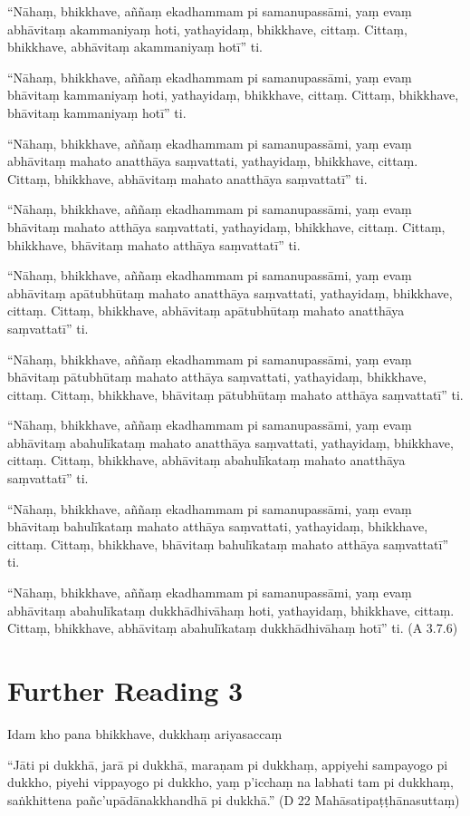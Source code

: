 “Nāhaṃ, bhikkhave, aññaṃ ekadhammam pi samanupassāmi, yaṃ evaṃ abhāvitaṃ akammaniyaṃ hoti, yathayidaṃ, bhikkhave, cittaṃ. Cittaṃ, bhikkhave, abhāvitaṃ akammaniyaṃ hotī” ti.

“Nāhaṃ, bhikkhave, aññaṃ ekadhammam pi samanupassāmi, yaṃ evaṃ bhāvitaṃ kammaniyaṃ hoti, yathayidaṃ, bhikkhave, cittaṃ. Cittaṃ, bhikkhave, bhāvitaṃ kammaniyaṃ hotī” ti.

“Nāhaṃ, bhikkhave, aññaṃ ekadhammam pi samanupassāmi, yaṃ evaṃ abhāvitaṃ mahato anatthāya saṃvattati, yathayidaṃ, bhikkhave, cittaṃ. Cittaṃ, bhikkhave, abhāvitaṃ mahato anatthāya saṃvattatī” ti.

“Nāhaṃ, bhikkhave, aññaṃ ekadhammam pi samanupassāmi, yaṃ evaṃ bhāvitaṃ mahato atthāya saṃvattati, yathayidaṃ, bhikkhave, cittaṃ. Cittaṃ, bhikkhave, bhāvitaṃ mahato atthāya saṃvattatī” ti.

“Nāhaṃ, bhikkhave, aññaṃ ekadhammam pi samanupassāmi, yaṃ evaṃ abhāvitaṃ apātubhūtaṃ mahato anatthāya saṃvattati, yathayidaṃ, bhikkhave, cittaṃ. Cittaṃ, bhikkhave, abhāvitaṃ apātubhūtaṃ mahato anatthāya saṃvattatī” ti.

“Nāhaṃ, bhikkhave, aññaṃ ekadhammam pi samanupassāmi, yaṃ evaṃ bhāvitaṃ pātubhūtaṃ mahato atthāya saṃvattati, yathayidaṃ, bhikkhave, cittaṃ. Cittaṃ, bhikkhave, bhāvitaṃ pātubhūtaṃ mahato atthāya saṃvattatī” ti.

“Nāhaṃ, bhikkhave, aññaṃ ekadhammam pi samanupassāmi, yaṃ evaṃ abhāvitaṃ abahulīkataṃ mahato anatthāya saṃvattati, yathayidaṃ, bhikkhave, cittaṃ. Cittaṃ, bhikkhave, abhāvitaṃ abahulīkataṃ mahato anatthāya saṃvattatī” ti.

“Nāhaṃ, bhikkhave, aññaṃ ekadhammam pi samanupassāmi, yaṃ evaṃ bhāvitaṃ bahulīkataṃ mahato atthāya saṃvattati, yathayidaṃ, bhikkhave, cittaṃ. Cittaṃ, bhikkhave, bhāvitaṃ bahulīkataṃ mahato atthāya saṃvattatī” ti.

“Nāhaṃ, bhikkhave, aññaṃ ekadhammam pi samanupassāmi, yaṃ evaṃ abhāvitaṃ abahulīkataṃ dukkhādhivāhaṃ hoti, yathayidaṃ, bhikkhave, cittaṃ. Cittaṃ, bhikkhave, abhāvitaṃ abahulīkataṃ dukkhādhivāhaṃ hotī” ti. \hfill(A 3.7.6)

\section*{Further Reading 3}

Idam kho pana bhikkhave, dukkhaṃ ariyasaccaṃ

“Jāti pi dukkhā, jarā pi dukkhā, maraṇam pi dukkhaṃ, appiyehi sampayogo pi dukkho, piyehi vippayogo pi dukkho‚ yaṃ p’icchaṃ na labhati tam pi dukkhaṃ, saṅkhittena pañc’upādānakkhandhā pi dukkhā.” \hfill(D 22 Mahāsatipaṭṭhānasuttaṃ)

